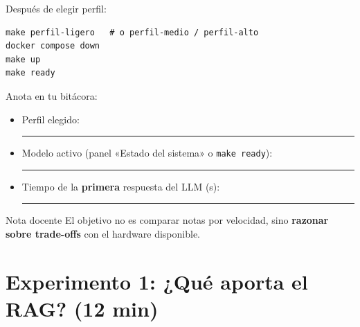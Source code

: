 \documentclass[12pt,a4paper]{article}
\begin{document}
Después de elegir perfil:

\begin{lstlisting}[style=shellstyle]
make perfil-ligero   # o perfil-medio / perfil-alto
docker compose down
make up
make ready
\end{lstlisting}

Anota en tu bitácora:

\begin{itemize}[noitemsep]
  \item Perfil elegido: \rule{6cm}{0.4pt}
  \item Modelo activo (panel «Estado del sistema» o \texttt{make ready}):
        \rule{4cm}{0.4pt}
  \item Tiempo de la \textbf{primera} respuesta del LLM (s):
        \rule{2cm}{0.4pt}
\end{itemize}

\begin{warnbox}{Nota docente}
El objetivo no es comparar notas por velocidad, sino \textbf{razonar sobre
trade-offs} con el hardware disponible.
\end{warnbox}

\section{Experimento 1: ¿Qué aporta el RAG? (12 min)}
\end{document}
